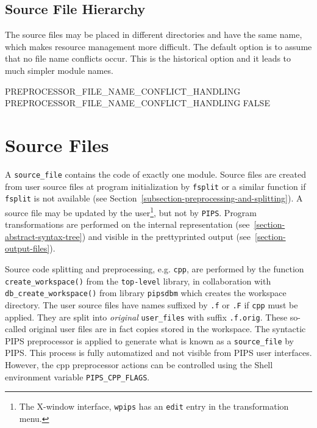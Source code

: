 \documentclass[a4paper]{report}
\newcommand{\Pips}{\texttt{PIPS}}
\begin{document}
\subsection{Source File Hierarchy}
\label{sec:source-file-hierarchy}

The source files may be placed in different directories and have the
same name, which makes resource management more difficult. The default
option is to assume that no file name conflicts occur. This is the
historical option and it leads to much simpler module names.

\begin{PipsProp}{PREPROCESSOR_FILE_NAME_CONFLICT_HANDLING}
PREPROCESSOR_FILE_NAME_CONFLICT_HANDLING FALSE
\end{PipsProp}


\section{Source Files}
\label{subsection-source-file}

A \verb/source_file/ contains the code of exactly one module. Source files
are created from user source files at program initialization by
\texttt{fsplit} or a similar function if \texttt{fsplit} is not available (see
Section~\ref{subsection-preprocessing-and-splitting}).  A
source file may be updated by the user\footnote{The
  X-window interface, \texttt{wpips} has an \texttt{edit} entry in the
  transformation menu.}, but not by \Pips{}. Program
transformations are performed on the internal representation
(see~\ref{section-abstract-syntax-tree}) and visible in the prettyprinted
output (see~\ref{section-output-files}).

Source code splitting and preprocessing, e.g. \texttt{cpp}, are performed
by the function \verb/create_workspace()/ from the \texttt{top-level} library,
in collaboration with \verb/db_create_workspace()/ from library
\texttt{pipsdbm} which creates the workspace directory. The user source
files have names suffixed by \texttt{.f} or \texttt{.F} if \texttt{cpp}
must be applied. They are split into {\em original} \verb/user_files/ with
suffix \texttt{.f.orig}. These so-called original user files are in fact
copies stored in the workspace. The syntactic PIPS preprocessor is
applied to generate what is known as a \verb/source_file/ by PIPS. This
process is fully automatized and not visible from PIPS user interfaces.
However, the cpp preprocessor actions can be controlled using the Shell
environment variable \verb/PIPS_CPP_FLAGS/.
\end{document}

